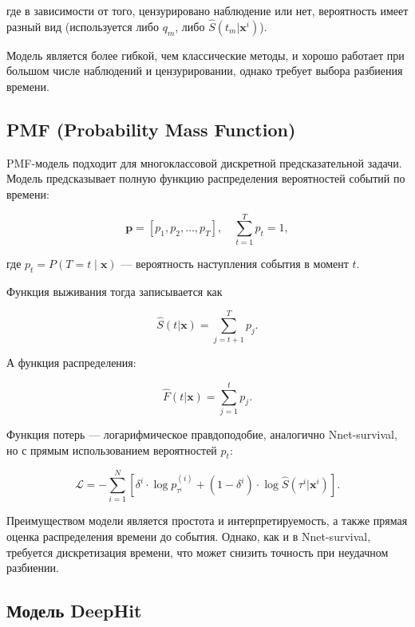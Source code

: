 \documentclass[a4paper,14pt,oneside,openany]{memoir}
\begin{document}
где в зависимости от того, цензурировано наблюдение или нет, вероятность имеет разный вид (используется либо $q_m$, либо $\hat{S}(t_m|\mathbf{x}^i)$).

Модель является более гибкой, чем классические методы, и хорошо работает при большом числе наблюдений и цензурировании, однако требует выбора разбиения времени.

\subsection{PMF (Probability Mass Function)}

PMF-модель  подходит для многоклассовой дискретной предсказательной задачи. Модель предсказывает полную функцию распределения вероятностей событий по времени:

\begin{equation}
	\mathbf{p} = [p_1, p_2, \ldots, p_T], \quad \sum_{t=1}^T p_t = 1,
\end{equation}

где $p_t = P(T = t \mid \mathbf{x})$ — вероятность наступления события в момент $t$.

Функция выживания тогда записывается как

\begin{equation}
	\hat{S}(t|\mathbf{x}) = \sum_{j=t+1}^T p_j.
\end{equation}

А функция распределения:

\begin{equation}
	\hat{F}(t|\mathbf{x}) = \sum_{j=1}^t p_j.
\end{equation}

Функция потерь — логарифмическое правдоподобие, аналогично Nnet-survival, но с прямым использованием вероятностей $p_t$:

\begin{equation}
	\mathcal{L} = -\sum_{i=1}^N \left[
	\delta^i \cdot \log p_{\tau^i}^{(i)} + (1 - \delta^i) \cdot \log \hat{S}(\tau^i|\mathbf{x}^i)
	\right].
\end{equation}

Преимуществом модели является простота и интерпретируемость, а также прямая оценка распределения времени до события. Однако, как и в Nnet-survival, требуется дискретизация времени, что может снизить точность при неудачном разбиении.

\subsection{Модель DeepHit}
\end{document}
